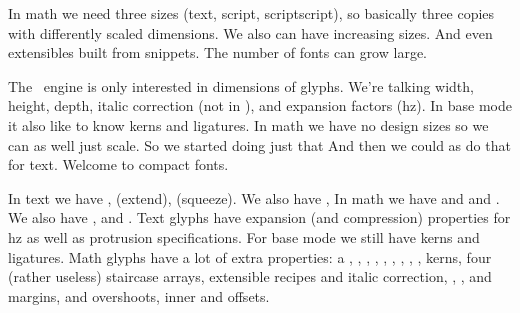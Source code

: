 \stoptitle

\starttitle[title=Math]

\startitemize
\startitem
    In math we need three sizes (text, script, scriptscript), so
    basically three copies with differently scaled
    dimensions.
\stopitem
\startitem
    We also can have increasing sizes.
\stopitem
\startitem
    And even extensibles built from snippets.
\stopitem
\startitem
    The number of fonts can grow large.
\stopitem
\stopitemize

\stoptitle

\starttitle[title=Evolution]

\startitemize
\startitem
    The \TEX\ engine is only interested in dimensions of glyphs.
\stopitem
\startitem
    We're talking width, height, depth, italic correction (not in \OPENTYPE),
    and expansion factors (hz).
\stopitem
\startitem
    In base mode it also like to know kerns and ligatures.
\stopitem
\startitem
    In math we have no design sizes so we can as well just scale. So we started
    doing just that
\stopitem
\startitem
    And then we could as do that for text. Welcome to compact fonts.
\stopitem
\stopitemize

\stoptitle

\starttitle[title=Evolution]

\startitemize
\startitem
    In text we have \typ {\glyphscale}, \typ {\glyphxscale} (extend), \typ
    {\glyphyscale} (squeeze).
\stopitem
\startitem
    We also have \typ {\glyphslant}, \typ {\glyphweight}
\stopitem
\startitem
    In math we have and  \typ {\Umathxscale} and \typ {\Umathyscale}.
\stopitem
\startitem
    We also have \typ {\glyphtextscale}, \typ {\glyphscriptscale} and
    \typ {\glyphscriptscriptscale}.
\stopitem
\startitem
    Text glyphs have expansion (and compression) properties for hz as well as
    protrusion specifications. For base mode we still have kerns and ligatures.
\stopitem
\stopitem
\startitem
    Math glyphs have a lot of extra properties: a , ,
    , , , ,
    , , , 
    kerns, four (rather useless) staircase arrays, extensible recipes and italic
    correction, , ,  and  margins,
     and  overshoots, inner  and  offsets.
\stopitem
\stopitemize

\stoptitle

\starttitle[title=Impact]

